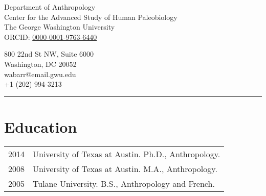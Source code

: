 \documentclass{article}
\begin{document}
\begin{center}
\end{center}

\vspace{15pt}

\noindent\begin{minipage}{.60\textwidth}
\begin{flushleft}
Department of Anthropology\\
Center for the Advanced Study of Human Paleobiology\\
The George Washington University\\
ORCID: \href{https://orcid.org/0000-0001-9763-6440}{0000-0001-9763-6440}\\
\end{flushleft}
\end{minipage}
\begin{minipage}{.395\textwidth}
\begin{flushright}
800 22nd St NW, Suite 6000\\
Washington, DC 20052 \\
wabarr@email.gwu.edu\\
+1 (202) 994-3213\\
\end{flushright}
\end{minipage}


\noindent\rule[-2mm]{\textwidth}{1pt}

\section*{Education}

\begin{tabular}{p{}p{}}
2014 & University of Texas at Austin. Ph.D., Anthropology. \\[4pt] %
2008 & University of Texas at Austin. M.A., Anthropology. \\[4pt]
2005 & Tulane University. B.S., Anthropology and French.\\
\end{tabular} 
\end{document}
